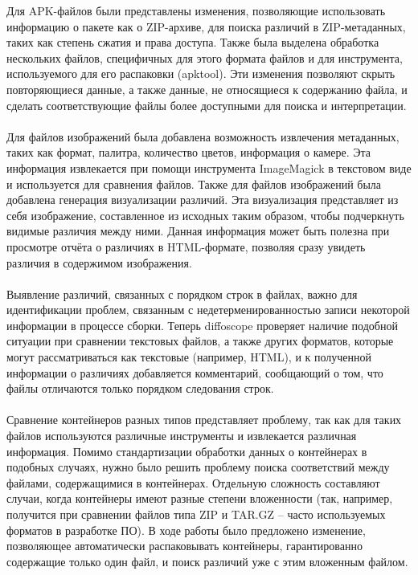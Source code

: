 Для APK-файлов были представлены изменения, позволяющие использовать информацию о пакете как о ZIP-архиве, для поиска различий в ZIP-метаданных, таких как степень сжатия и права доступа. Также была выделена обработка нескольких файлов, специфичных для этого формата файлов и для инструмента, используемого для его распаковки (apktool). Эти изменения позволяют скрыть повторяющиеся данные, а также данные, не относящиеся к содержанию файла, и сделать соответствующие файлы более доступными для поиска и интерпретации.\\\\
Для файлов изображений была добавлена возможность извлечения метаданных, таких как формат, палитра, количество цветов, информация о камере. Эта информация извлекается при помощи инструмента ImageMagick в текстовом виде и используется для сравнения файлов. Также для файлов изображений была добавлена генерация визуализации различий. Эта визуализация представляет из себя изображение, составленное из исходных таким образом, чтобы подчеркнуть видимые различия между ними. Данная информация может быть полезна при просмотре отчёта о различиях в HTML-формате, позволяя сразу увидеть различия в содержимом изображения.\\\\
Выявление различий, связанных с порядком строк в файлах, важно для идентификации проблем, связанным с недетерменированностью записи некоторой информации в процессе сборки. Теперь diffoscope проверяет наличие подобной ситуации при сравнении текстовых файлов, а также других форматов, которые могут рассматриваться как текстовые (например, HTML), и к полученной информации о различиях добавляется комментарий, сообщающий о том, что файлы отличаются только порядком следования строк.\\\\
Сравнение контейнеров разных типов представляет проблему, так как для таких файлов используются различные инструменты и извлекается различная информация. Помимо стандартизации обработки данных о контейнерах в подобных случаях, нужно было решить проблему поиска соответствий между файлами, содержащимися в контейнерах. Отдельную сложность составляют случаи, когда контейнеры имеют разные степени вложенности (так, например, получится при сравнении файлов типа ZIP и TAR.GZ -- часто используемых форматов в разработке ПО). В ходе работы было предложено изменение, позволяющее автоматически распаковывать контейнеры, гарантированно содержащие только один файл, и поиск различий уже с этим вложенным файлом.\\\\
